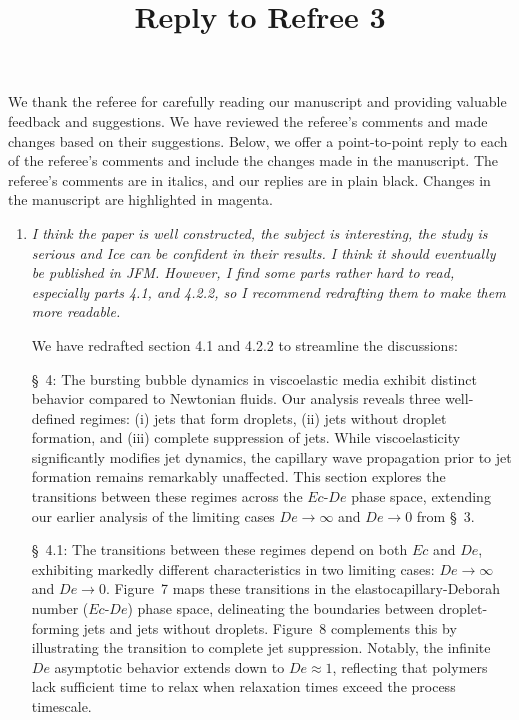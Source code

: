 \documentclass[]{article}
\title{\textbf{Reply to Refree 3}}
\date{\vspace{-5ex}}
\newcommand{\vsy}[1]{\todo[color=orange, bordercolor=none, textcolor=white]{Vatsal}\textcolor{orange}{#1}}
\newcommand{\oo}{\color{magenta} \normalfont}
\newcommand{\bb}{\color{black} \normalfont}
\begin{document}
	\maketitle %
We thank the referee for carefully reading our manuscript and providing valuable feedback and suggestions. We have reviewed the referee’s comments and made changes based on their suggestions. Below, we offer a point-to-point reply to each of the referee’s comments and include the changes made in the manuscript. The referee’s comments are in italics, and our replies are in plain black. Changes in the manuscript are highlighted in magenta.

\begin{enumerate}
    \item \textit{I think the paper is well constructed, the subject is interesting, the study is serious and Ice can be confident in their results. I think it should eventually be published in JFM. However, I find some parts rather hard to read, especially parts 4.1, and 4.2.2, so I recommend redrafting them to make them more readable.}


	We have redrafted section 4.1 and 4.2.2 to streamline the discussions:

	\oo
	\S~4:
	The bursting bubble dynamics in viscoelastic media exhibit distinct behavior compared to Newtonian fluids.
	Our analysis reveals three well-defined regimes: (i) jets that form droplets, (ii) jets without droplet formation, and (iii) complete suppression of jets. While viscoelasticity significantly modifies jet dynamics, the capillary wave propagation prior to jet formation remains remarkably unaffected.
	This section explores the transitions between these regimes across the $Ec$-$De$ phase space, extending our earlier analysis of the limiting cases $De \to \infty$ and $De \to 0$ from \S~3.

	\S~4.1:
	The transitions between these regimes depend on both $Ec$ and $De$, exhibiting markedly different characteristics in two limiting cases: $De \to \infty$ and $De \to 0$.
	Figure~7 maps these transitions in the elastocapillary-Deborah number ($Ec$-$De$) phase space, delineating the boundaries between droplet-forming jets and jets without droplets. Figure~8 complements this by illustrating the transition to complete jet suppression. Notably, the infinite $De$ asymptotic behavior extends down to $De \approx 1$, reflecting that polymers lack sufficient time to relax when relaxation times exceed the process timescale.\bb


\end{enumerate}
\end{document}
